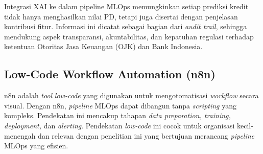 Integrasi XAI ke dalam pipeline MLOps memungkinkan setiap prediksi kredit tidak hanya menghasilkan nilai PD, tetapi juga disertai dengan penjelasan kontribusi fitur. Informasi ini dicatat sebagai bagian dari \textit{audit trail}, sehingga mendukung aspek transparansi, akuntabilitas, dan kepatuhan regulasi terhadap ketentuan Otoritas Jasa Keuangan (OJK) dan Bank Indonesia.\cite{ye2025unlocking}

\subsection{Low-Code Workflow Automation (n8n)}
n8n adalah \textit{tool} \textit{low-code} yang digunakan untuk mengotomatisasi \textit{workflow} secara visual. Dengan n8n, \textit{pipeline} MLOps dapat dibangun tanpa \textit{scripting} yang kompleks. Pendekatan ini mencakup tahapan \textit{data preparation, training, deployment,} dan \textit{alerting}. Pendekatan \textit{low-code} ini cocok untuk organisasi kecil-menengah dan relevan dengan penelitian ini yang bertujuan merancang \textit{pipeline} MLOps yang efisien.\cite{Sundberg2023}



